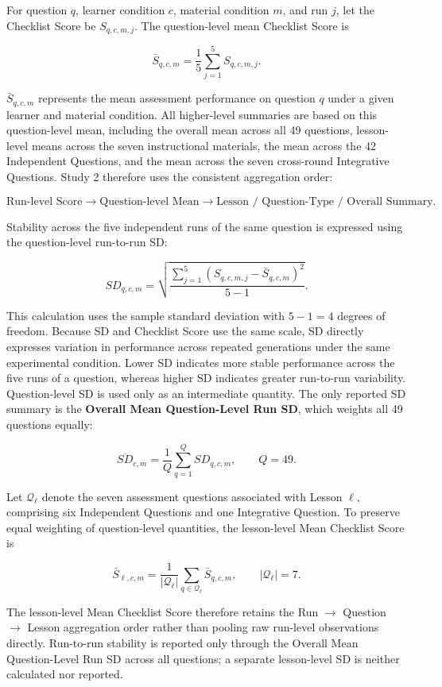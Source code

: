 For question $q$, learner condition $c$, material condition $m$, and run $j$, let the Checklist Score be $S_{q,c,m,j}$. The question-level mean Checklist Score is

\[
\bar S_{q,c,m}
=
\frac{1}{5}
\sum_{j=1}^{5}
S_{q,c,m,j}.
\]

$\bar S_{q,c,m}$ represents the mean assessment performance on question $q$ under a given learner and material condition. All higher-level summaries are based on this question-level mean, including the overall mean across all 49 questions, lesson-level means across the seven instructional materials, the mean across the 42 Independent Questions, and the mean across the seven cross-round Integrative Questions. Study 2 therefore uses the consistent aggregation order:

{\small
\[
\text{Run-level Score}
\rightarrow
\text{Question-level Mean}
\rightarrow
\text{Lesson / Question-Type / Overall Summary}.
\]
}

Stability across the five independent runs of the same question is expressed using the question-level run-to-run SD:

\[
SD_{q,c,m}
=
\sqrt{
\frac{
\sum_{j=1}^{5}
\left(
S_{q,c,m,j}-\bar S_{q,c,m}
\right)^2
}{
5-1
}
}.
\]

This calculation uses the sample standard deviation with $5-1=4$ degrees of freedom. Because SD and Checklist Score use the same scale, SD directly expresses variation in performance across repeated generations under the same experimental condition. Lower SD indicates more stable performance across the five runs of a question, whereas higher SD indicates greater run-to-run variability. Question-level SD is used only as an intermediate quantity. The only reported SD summary is the \textbf{Overall Mean Question-Level Run SD}, which weights all 49 questions equally:

\[
\overline{SD}_{c,m}
=
\frac{1}{Q}
\sum_{q=1}^{Q}
SD_{q,c,m},
\qquad Q=49.
\]

Let $\mathcal Q_\ell$ denote the seven assessment questions associated with Lesson $\ell$, comprising six Independent Questions and one Integrative Question. To preserve equal weighting of question-level quantities, the lesson-level Mean Checklist Score is

\[
\bar S_{\ell,c,m}
=
\frac{1}{|\mathcal Q_\ell|}
\sum_{q\in\mathcal Q_\ell}
\bar S_{q,c,m},
\qquad
|\mathcal Q_\ell|=7.
\]

The lesson-level Mean Checklist Score therefore retains the Run $\rightarrow$ Question $\rightarrow$ Lesson aggregation order rather than pooling raw run-level observations directly. Run-to-run stability is reported only through the Overall Mean Question-Level Run SD across all questions; a separate lesson-level SD is neither calculated nor reported.

